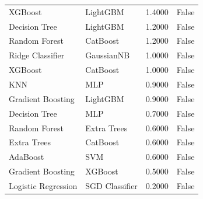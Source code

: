 \begin{tabular}{llrr}
XGBoost & LightGBM & 1.4000 & False \\
Decision Tree & LightGBM & 1.2000 & False \\
Random Forest & CatBoost & 1.2000 & False \\
Ridge Classifier & GaussianNB & 1.0000 & False \\
XGBoost & CatBoost & 1.0000 & False \\
KNN & MLP & 0.9000 & False \\
Gradient Boosting & LightGBM & 0.9000 & False \\
Decision Tree & MLP & 0.7000 & False \\
Random Forest & Extra Trees & 0.6000 & False \\
Extra Trees & CatBoost & 0.6000 & False \\
AdaBoost & SVM & 0.6000 & False \\
Gradient Boosting & XGBoost & 0.5000 & False \\
Logistic Regression & SGD Classifier & 0.2000 & False \\
\bottomrule
\end{tabular}
